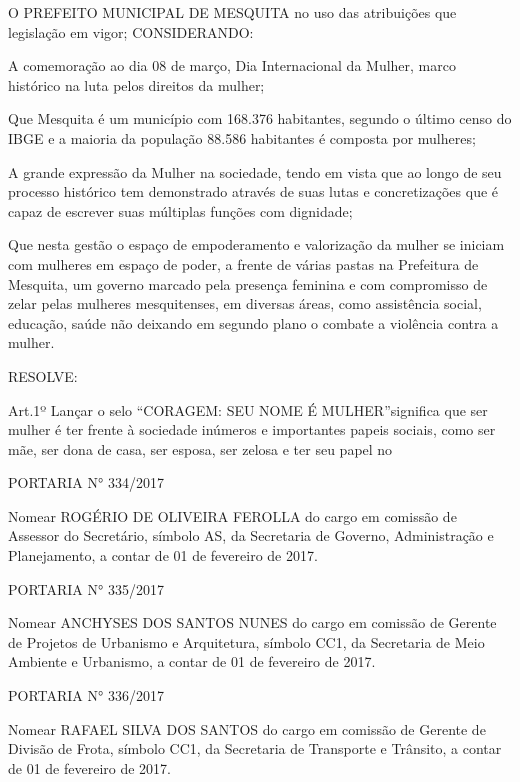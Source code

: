 \documentclass{doliberto}
\begin{document}
O  PREFEITO  MUNICIPAL  DE  MESQUITA  no  uso  das 
atribuições  que 
legislação  em  vigor; 
CONSIDERANDO: 
 
A  comemoração  ao  dia  08  de  março,  Dia  Internacional  da 
Mulher, marco histórico na luta pelos direitos da mulher; 
 
Que  Mesquita  é  um  município  com  168.376  habitantes, 
segundo o último censo do  IBGE e a  maioria da população 
88.586 habitantes é composta por mulheres; 
 
A grande expressão da Mulher na sociedade, tendo em vista 
que  ao  longo  de  seu  processo  histórico  tem  demonstrado 
através  de  suas  lutas  e  concretizações  que  é  capaz  de 
escrever suas múltiplas funções com dignidade; 

Que nesta gestão o espaço de empoderamento e valorização 
da mulher se iniciam com mulheres em espaço de poder, a 
frente  de  várias  pastas  na  Prefeitura  de  Mesquita,  um 
governo  marcado  pela  presença 
feminina  e  com 
compromisso  de  zelar  pelas  mulheres  mesquitenses,  em 
diversas  áreas,  como  assistência  social,  educação,  saúde 
não  deixando  em  segundo  plano  o  combate  a  violência 
contra a mulher.  

RESOLVE:  

Art.1º  Lançar  o  selo 
“CORAGEM:  SEU  NOME  É 
MULHER”significa que ser mulher é ter frente à sociedade 
inúmeros  e  importantes  papeis  sociais,  como  ser  mãe,  ser 
dona  de  casa,  ser  esposa,  ser  zelosa  e  ter  seu  papel  no 

 

PORTARIA N° 334/2017 

Nomear  ROGÉRIO  DE  OLIVEIRA  FEROLLA  do  cargo  em 
comissão  de  Assessor  do  Secretário,  símbolo  AS,  da 
Secretaria  de  Governo,  Administração  e  Planejamento, 
a contar de 01 de fevereiro de 2017. 

PORTARIA N° 335/2017 

Nomear  ANCHYSES  DOS  SANTOS  NUNES  do  cargo  em 
comissão  de  Gerente  de  Projetos  de  Urbanismo  e 
Arquitetura,  símbolo  CC1,  da  Secretaria  de  Meio 
Ambiente  e  Urbanismo,  a  contar  de  01  de  fevereiro  de 
2017. 

PORTARIA N° 336/2017 

Nomear  RAFAEL  SILVA  DOS  SANTOS  do  cargo  em 
comissão  de  Gerente  de  Divisão  de  Frota,  símbolo  CC1, 
da  Secretaria  de  Transporte  e  Trânsito,  a  contar  de  01 
de fevereiro de 2017. 
\end{document}
